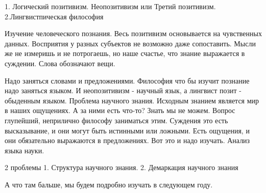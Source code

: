 1. Логический позитивизм. Неопозитивизм или Третий позитивизм. 2.Лингвистпическая философия

Изучение человеческого познания. Весь позитивизм основывается на чувственных данных. Восприятия у разных субъектов не возможно даже сопоставить. Мысли же не измеришь и не потрогаешь, но наше счастье, что знание выражается в суждении. Слова обозначают вещи.

Надо заняться словами и предложениями. Философия что бы изучит познание надо заняться языком. И неопозитивизм - научный язык, а лингвист позит - обыденным языком. Проблема научного знания. Исходным знанием является мир в наших ощущениях. А за ними есть что-то? Знать мы не можем. Вопрос глупейший, неприлично философу заниматься этим. Суждения это есть высказывание, и они могут быть истинными или ложными. Есть ощущения, и они обязательно выражаются в предложениях. Вот это и надо изучать. Анализ языка науки.

    2 проблемы 1. Структура научного знания. 2. Демаркация научного знания

А что там бальше, мы будем подробно изучать в следующем году.
